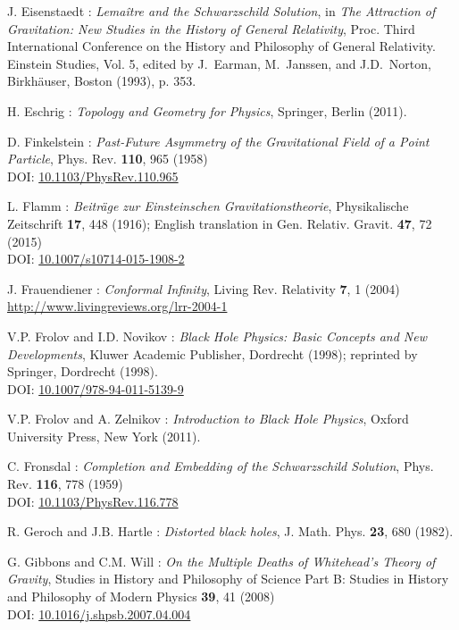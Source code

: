 \begin{thebibliography}{123}
J. Eisenstaedt : {\em Lemaître and the Schwarzschild Solution}, in
{\em The Attraction of Gravitation: New Studies in the History of
General Relativity}, Proc. Third International Conference on the History and Philosophy of General Relativity. Einstein
Studies, Vol. 5, edited by J.~Earman, M.~Janssen, and J.D.~Norton,
Birkhäuser, Boston (1993), p. 353.

H. Eschrig : {\em Topology and Geometry for Physics},
Springer, Berlin (2011).

D. Finkelstein :
{\em Past-Future Asymmetry of the Gravitational Field of a Point Particle},
Phys. Rev. {\bf 110}, 965 (1958)\\
DOI: \href{http://dx.doi.org/10.1103/PhysRev.110.965}{10.1103/PhysRev.110.965}

L. Flamm : {\em Beiträge zur Einsteinschen Gravitationstheorie},
Physikalische Zeitschrift {\bf 17}, 448 (1916); English translation in
Gen. Relativ. Gravit. {\bf 47}, 72 (2015)\\
DOI: \href{http://dx.doi.org/10.1007/s10714-015-1908-2}{10.1007/s10714-015-1908-2}

J. Frauendiener :
{\em Conformal Infinity},
Living Rev. Relativity {\bf 7}, 1 (2004) \\
\url{http://www.livingreviews.org/lrr-2004-1}

V.P. Frolov and I.D. Novikov : {\em Black Hole Physics:
Basic Concepts and New Developments},
Kluwer Academic Publisher, Dordrecht (1998); reprinted by
Springer, Dordrecht (1998). \\
DOI: \href{http://dx.doi.org/10.1007/978-94-011-5139-9}{10.1007/978-94-011-5139-9}

V.P. Frolov and A. Zelnikov : {\em Introduction to Black Hole Physics},
Oxford University Press, New York (2011).

C. Fronsdal : {\em Completion and Embedding of the Schwarzschild Solution},
Phys. Rev. {\bf 116}, 778 (1959) \\
DOI: \href{https://doi.org/10.1103/PhysRev.116.778}{10.1103/PhysRev.116.778}

R. Geroch and J.B. Hartle : {\em Distorted black holes},
J. Math. Phys. {\bf 23}, 680 (1982).

G. Gibbons and C.M. Will : {\em On the Multiple Deaths of Whitehead's Theory of Gravity},
Studies in History and Philosophy of Science Part B: Studies in History and Philosophy of Modern Physics {\bf 39}, 41 (2008)\\
DOI: \href{http://dx.doi.org/doi:10.1016/j.shpsb.2007.04.004}{10.1016/j.shpsb.2007.04.004}


\end{thebibliography}
